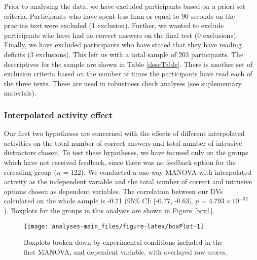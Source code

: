 \documentclass[11pt,]{article}
\begin{document}
Prior to analysing the data, we have excluded participants based on a
priori set criteria. Participants who have spent less than or equal to
90 seconds on the practice text were excluded (1 exclusion). Further, we
wanted to exclude participants who have had no correct answers on the
final test (0 exclusions). Finally, we have excluded participants who
have stated that they have reading deficits (3 exclusions). This left us
with a total sample of 203 participants. The descriptives for the sample
are shown in Table \ref{descTable}. There is another set of exclusion
criteria based on the number of times the participants have read each of
the three texts. These are used in robustness check analyses (see
suplementary materials).

\hypertarget{interpolated-activity-effect}{%
\subsubsection{Interpolated activity
effect}\label{interpolated-activity-effect}}

Our first two hypotheses are concerned with the effects of different
interpolated activities on the total number of correct answers and total
number of intrusive distractors chosen. To test these hypotheses, we
have focused only on the groups which have not received feedback, since
there was no feedback option for the rereading group (\(n\) = 122). We
conducted a one-way MANOVA with interpolated activity as the independent
variable and the total number of correct and intrusive options chosen as
dependent variables. The correlation between our DVs calculated on the
whole sample is -0.71 (95\% CI: {[}-0.77, -0.63{]}, \(p\) =
\(4.793\times 10^{-32}\)). Boxplots for the groups in this analysis are
shown in Figure \ref{box1}.

\begin{figure*}[h]

{\centering \texttt{[image: analyses-main\_files/figure-latex/boxPlot-1]} 

}

\caption{\label{box1} Boxplots broken down by experimental conditions included in the first MANOVA, and dependent variable, with overlayed raw scores.}\label{fig:boxPlot}
\end{figure*}
\end{document}
